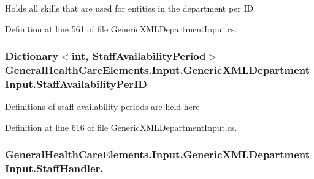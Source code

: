 Holds all skills that are used for entities in the department per ID 



Definition at line 561 of file Generic\+X\+M\+L\+Department\+Input.\+cs.

\subsubsection[{\texorpdfstring{Staff\+Availability\+Per\+ID}{StaffAvailabilityPerID}}]{\setlength{\rightskip}{0pt plus 5cm}Dictionary$<$int, {\bf Staff\+Availability\+Period}$>$ General\+Health\+Care\+Elements.\+Input.\+Generic\+X\+M\+L\+Department\+Input.\+Staff\+Availability\+Per\+ID\hspace{0.3cm}{\ttfamily [get]}}\hypertarget{class_general_health_care_elements_1_1_input_1_1_generic_x_m_l_department_input_a06408031dd37dc97e6e6a521be722323}{}\label{class_general_health_care_elements_1_1_input_1_1_generic_x_m_l_department_input_a06408031dd37dc97e6e6a521be722323}


Definitions of staff availability periods are held here 



Definition at line 616 of file Generic\+X\+M\+L\+Department\+Input.\+cs.

\subsubsection[{\texorpdfstring{Staff\+Handler}{StaffHandler}}]{ General\+Health\+Care\+Elements.\+Input.\+Generic\+X\+M\+L\+Department\+Input.\+Staff\+Handler\hspace{0.3cm}{\ttfamily [get]}, {\ttfamily [set]}}\hypertarget{class_general_health_care_elements_1_1_input_1_1_generic_x_m_l_department_input_a59c888320a795b9431d4726a7d0edcf8}{}\label{class_general_health_care_elements_1_1_input_1_1_generic_x_m_l_department_input_a59c888320a795b9431d4726a7d0edcf8}


